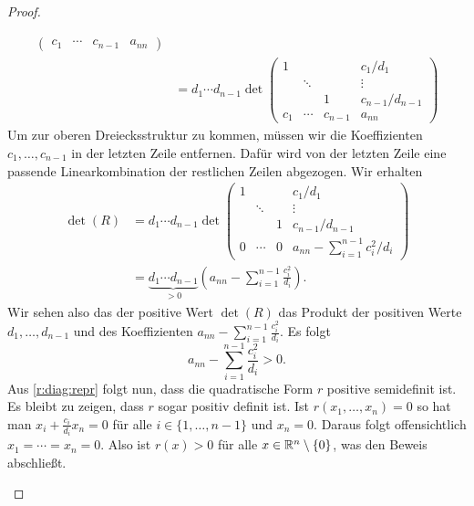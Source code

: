 \begin{proof}
\begin{itemize}
\begin{align*}
\begin{pmatrix}
					c_1 & \cdots & c_{n-1} & a_{nn}
				\end{pmatrix} \\
				&= d_1 \cdots d_{n-1} \det\begin{pmatrix}
					1 &&& c_1 / d_1 \\
					& \ddots && \vdots \\
					&& 1 & c_{n-1} / d_{n-1} \\
					c_1 & \cdots & c_{n-1} & a_{nn}
				\end{pmatrix}   
			\end{align*}
			Um zur oberen Dreiecksstruktur zu kommen, müssen wir die Koeffizienten $c_1,\ldots,c_{n-1}$ in der letzten Zeile entfernen. Dafür wird von der letzten Zeile eine passende Linearkombination der restlichen Zeilen abgezogen. Wir erhalten 
			\begin{align*}
				\det(R) &= d_1 \cdots d_{n-1} \det\begin{pmatrix}
					1 &&& c_1 / d_1 \\
					& \ddots && \vdots \\
					&& 1 & c_{n-1} / d_{n-1} \\
					0 & \cdots & 0 & a_{nn} - \sum_{i=1}^{n-1} c_i^2 / d_i
				\end{pmatrix} \\
				&= \underbrace{d_1 \cdots d_{n-1}}_{>0} \left( a_{nn} - \sum_{i=1}^{n-1} \frac{c_i^2}{d_i} \right).
			\end{align*}
			Wir sehen also das der positive Wert $\det(R)$ das Produkt der positiven Werte $d_1,\ldots,d_{n-1}$ und des Koeffizienten $a_{nn} - \sum_{i=1}^{n-1} \frac{c_i^2}{d_i}$. Es folgt 
			\[
				a_{nn} - \sum_{i=1}^{n-1} \frac{c_i^2}{d_i} > 0.
			\]
			Aus \eqref{r:diag:repr} folgt nun, dass die quadratische Form $r$ positive semidefinit ist. Es bleibt zu zeigen, dass $r$ sogar positiv definit ist. Ist $r(x_1,\ldots,x_n)= 0$ so hat man $x_i + \frac{c_i}{d_i} x_n = 0$ für alle $i \in \{1,\ldots,n-1\}$ und $x_n=0$. Daraus folgt offensichtlich $x_1 = \cdots = x_n=0$. Also ist $r(x) > 0$ für alle $x \in \mathbb R^n \setminus \{0\}$, was den Beweis abschließt.  \qedhere
	\end{itemize}
\end{proof}


